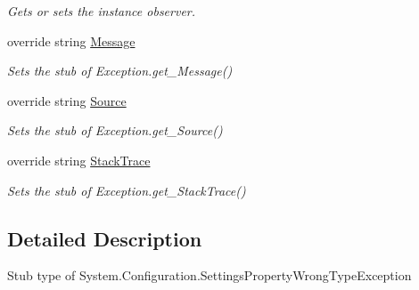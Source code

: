 \begin{DoxyCompactItemize}
\begin{DoxyCompactList}\small\item\em Gets or sets the instance observer.\end{DoxyCompactList}\item 
override string \hyperlink{class_system_1_1_configuration_1_1_fakes_1_1_stub_settings_property_wrong_type_exception_ab95183f51715f14f607403016ed244b0}{Message}
\begin{DoxyCompactList}\small\item\em Sets the stub of Exception.\-get\-\_\-\-Message()\end{DoxyCompactList}\item 
override string \hyperlink{class_system_1_1_configuration_1_1_fakes_1_1_stub_settings_property_wrong_type_exception_ad64f6c50ddbc348ffffb60f73ef8476f}{Source}
\begin{DoxyCompactList}\small\item\em Sets the stub of Exception.\-get\-\_\-\-Source()\end{DoxyCompactList}\item 
override string \hyperlink{class_system_1_1_configuration_1_1_fakes_1_1_stub_settings_property_wrong_type_exception_af62141935e8717ff1885ca0fd8544787}{Stack\-Trace}
\begin{DoxyCompactList}\small\item\em Sets the stub of Exception.\-get\-\_\-\-Stack\-Trace()\end{DoxyCompactList}\end{DoxyCompactItemize}


\subsection{Detailed Description}
Stub type of System.\-Configuration.\-Settings\-Property\-Wrong\-Type\-Exception



